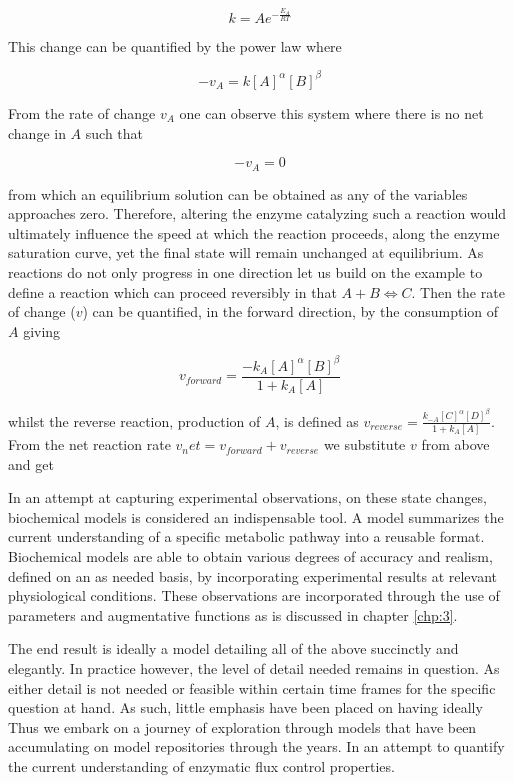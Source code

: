\begin{equation}
k = Ae^{-\frac{E_A}{RT}}
\end{equation}

This change can be quantified by the power law where 

\begin{equation}
-v_A = k[A]^\alpha[B]^\beta
\end{equation}

From the rate of change $v_A$ one can observe this system where there is no net change in $A$ such that

\begin{equation}
-v_A = 0
\end{equation} 

from which an equilibrium solution can be obtained as any of the variables approaches zero. Therefore, altering the enzyme catalyzing such a reaction would ultimately influence the speed at which the reaction proceeds, along the enzyme saturation curve, yet the final state will remain unchanged at equilibrium. As reactions do not only progress in one direction let us build on the example to define a reaction which can proceed reversibly in that $A + B \Longleftrightarrow  C$. Then the rate of change ($v$) can be quantified, in the forward direction, by the consumption of $A$ giving

\begin{equation}
    v_{forward} = \frac{-k_A[A]^\alpha[B]^\beta}{1+k_A[A]}
\end{equation} 

whilst the reverse reaction, production of $A$, is defined as $v_{reverse} = \frac{k_{-A}[C]^\alpha[D]^\beta}{1+k_{A}[A]}$. From the net reaction rate $v_net = v_{forward} + v_{reverse}$ we substitute $v$ from above and  get $$ 

In an attempt at capturing experimental observations, on these state changes, biochemical models is considered an indispensable tool. A model summarizes the current understanding of a specific metabolic pathway into a reusable format. Biochemical models are able to obtain various degrees of accuracy and realism, defined on an as needed basis, by incorporating experimental results at relevant physiological conditions. These observations are incorporated through the use of parameters and augmentative functions as is discussed in chapter \ref{chp:3}. 

The end result is ideally a model detailing all of the above succinctly and elegantly. In practice however, the level of detail needed remains in question. As either detail is not needed or feasible within certain time frames for the specific question at hand. As such, little emphasis have been placed on having ideally Thus we embark on a journey of exploration through models that have been accumulating on model repositories through the years. In an attempt to quantify the current understanding of enzymatic flux control properties.




